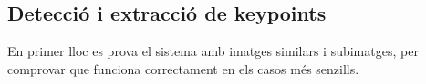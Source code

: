 


\newpage
	\subsection{Detecció i extracció de keypoints}
		En primer lloc es prova el sistema amb imatges similars i subimatges, per comprovar  que funciona correctament en els casos més senzills.


